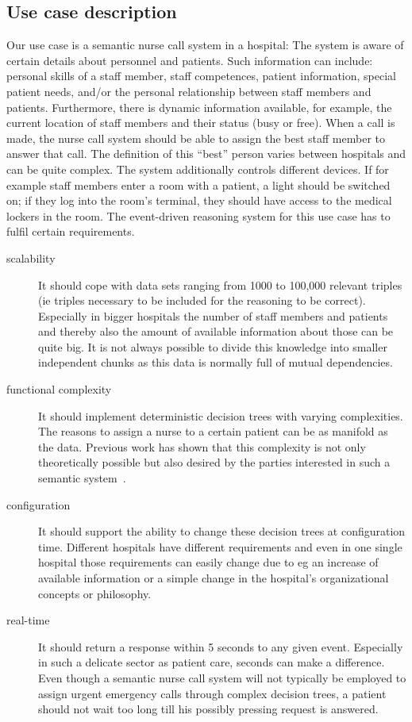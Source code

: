 \subsection{Use case description}
Our use case is a semantic nurse call system in a hospital:
The system is aware of certain details about personnel and patients. %
Such information can include: personal skills of a staff member, staff competences, patient information, special patient needs, and/or the 
personal relationship between staff members and patients. 
Furthermore, there is dynamic information available, for example, the current location of staff members and their status (busy or free). 
When a call is made, the nurse
call system should be able to assign the best staff member to answer that call. The definition of this ``best'' person
varies between hospitals and can be quite complex. 
The system additionally controls different devices. If for example staff members enter a room with a patient, 
a light should be switched on; if they log into the room's terminal, they should have access to the medical lockers in the room. 
The event-driven reasoning system for this use case has to fulfil certain requirements.
\begin{description}
\item[scalability] It should cope with data sets ranging from 1000 to 100,000 relevant triples (ie triples necessary to be included for the reasoning to be correct). 
Especially in bigger hospitals the number of staff members and patients and thereby also the amount of available information about those can be quite big. 
It is not always possible to divide this knowledge into smaller independent chunks as this data is normally full of mutual dependencies. 
\item[functional complexity] It should implement deterministic decision trees with varying complexities. The reasons to assign a nurse to 
a certain patient can be as manifold as the data. Previous work has shown that this complexity is not only theoretically possible but also desired by the 
parties interested in such a semantic system~\cite{accioontold}.
\item[configuration] It should support the ability to change these decision trees at configuration time. Different hospitals have different 
requirements and even in one single hospital those requirements 
can easily change due to eg an increase of available information or a simple change in the hospital's organizational concepts or philosophy.
\item[real-time] It should return a response within 5 seconds to any given event. Especially in such a delicate sector as patient care, seconds can make a difference. 
Even though a semantic nurse call system will not typically be employed to assign urgent emergency calls  through complex decision trees, 
a patient should not wait too long till his possibly pressing request is answered.
\end{description}
